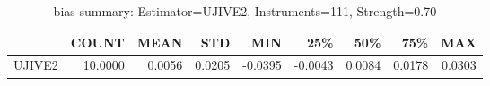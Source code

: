\begin{table}[ht]
\centering
\caption{bias summary: Estimator=UJIVE2, Instruments=111, Strength=0.70}
\begin{tabular}{lrrrrrrrr}
\toprule
 & COUNT & MEAN & STD & MIN & 25\% & 50\% & 75\% & MAX \\
\midrule
UJIVE2 & 10.0000 & 0.0056 & 0.0205 & -0.0395 & -0.0043 & 0.0084 & 0.0178 & 0.0303 \\
\bottomrule
\end{tabular}
\end{table}
